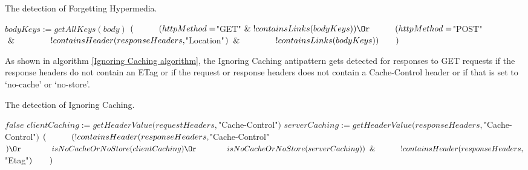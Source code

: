 \begin{algorithm}
\caption{The detection of Forgetting Hypermedia.}
\begin{algorithmic}
\State $bodyKeys := getAllKeys(body)$
\State \Return $( \newline 
\hspace*{3em} (httpMethod = $"GET"$ \And !containsLinks(bodyKeys)) \Or \newline 
\hspace*{3em} (httpMethod = $"POST"$ \And \newline 
\hspace*{4em} !containsHeader(responseHeaders, $"Location"$) \And \newline 
\hspace*{4em} !containsLinks(bodyKeys)) \newline 
\hspace*{2em})$
\EndFunction
\end{algorithmic}
\label{Forgetting Hypermedia algorithm}
\end{algorithm}

As shown in algorithm \ref{Ignoring Caching algorithm}, the Ignoring Caching antipattern gets detected for responses to GET requests if the response headers do not contain an ETag or if the request or response headers does not contain a Cache-Control header or if that is set to `no-cache' or `no-store'.

\begin{algorithm}
\caption{The detection of Ignoring Caching.}
\begin{algorithmic}
\State \Return $false$
\EndIf
\State $clientCaching := getHeaderValue(requestHeaders, $"Cache-Control"$)$
\State $serverCaching := getHeaderValue(responseHeaders, $"Cache-Control"$)$
\State \Return $( \newline
\hspace*{3em} (!containsHeader(responseHeaders, $"Cache-Control"$) \Or \newline
\hspace*{4em} isNoCacheOrNoStore(clientCaching) \Or \newline
\hspace*{4em} isNoCacheOrNoStore(serverCaching)) \And \newline
\hspace*{3em} !containsHeader(responseHeaders, $"Etag"$) \newline
\hspace*{2em})$
\EndFunction
\end{algorithmic}
\label{Ignoring Caching algorithm}
\end{algorithm}

